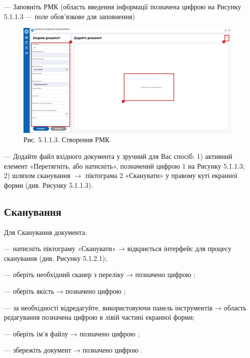 --- Заповніть РМК (область введення інформації позначена цифрою  на
Рисунку 5.1.1.3 \circled{$\ast$} --- поле обов'язкове для заповнення)

\begin{figure}[!htbp]
\centerline{\includegraphics[width=\textwidth]{img/5.1.1.3.png}}
\caption{Рис. 5.1.1.3. Створення РМК}
\end{figure}

--- Додайте файл вхідного документа у зручний для Вас спосіб:
1) активний елемент «Перетягніть, або натисніть», позначений цифрою 1 на Рисунку 5.1.1.3;
2) шляхом сканування $\rightarrow$ піктограма 2 «Сканувати» у правому куті екранної форми (див. Рисунку 5.1.1.3).

\subsection{Сканування}

Для Сканування документа:

--- натисніть піктограму «Сканувати» → відкриється інтерфейс для процесу
сканування (див. Рисунку 5.1.2.1);

--- оберіть необхідний сканер з переліку → позначено цифрою ;

--- оберіть якість → позначено цифрою ;

--- за необхідності відредагуйте, використовуючи панель інструментів →
область редагування позначена цифрою  в лівій частині екранної форми;

--- оберіть ім'я файлу → позначено цифрою ;

--- збережіть документ → позначено цифрою .

